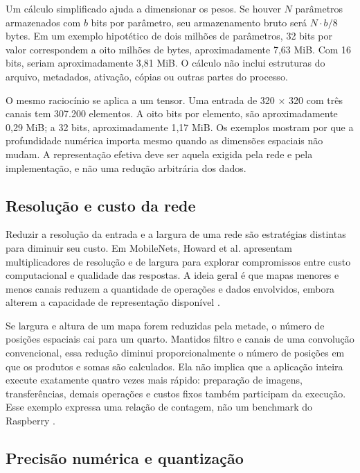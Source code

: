 Um cálculo simplificado ajuda a dimensionar os pesos. Se houver \(N\) parâmetros armazenados com \(b\) bits por parâmetro, seu armazenamento bruto será \(N\cdot b/8\) bytes. Em um exemplo hipotético de dois milhões de parâmetros, 32 bits por valor correspondem a oito milhões de bytes, aproximadamente 7,63 MiB. Com 16 bits, seriam aproximadamente 3,81 MiB. O cálculo não inclui estruturas do arquivo, metadados, ativação, cópias ou outras partes do processo.

O mesmo raciocínio se aplica a um tensor. Uma entrada de 320 \(\times\) 320 com três canais tem 307.200 elementos. A oito bits por elemento, são aproximadamente 0,29 MiB; a 32 bits, aproximadamente 1,17 MiB. Os exemplos mostram por que a profundidade numérica importa mesmo quando as dimensões espaciais não mudam. A representação efetiva deve ser aquela exigida pela rede e pela implementação, e não uma redução arbitrária dos dados.

\subsection{Resolução e custo da rede}
\label{subsec:resolucao-custo}

Reduzir a resolução da entrada e a largura de uma rede são estratégias distintas para diminuir seu custo. Em MobileNets, Howard et al. apresentam multiplicadores de resolução e de largura para explorar compromissos entre custo computacional e qualidade das respostas. A ideia geral é que mapas menores e menos canais reduzem a quantidade de operações e dados envolvidos, embora alterem a capacidade de representação disponível \cite{mobilenets}.

Se largura e altura de um mapa forem reduzidas pela metade, o número de posições espaciais cai para um quarto. Mantidos filtro e canais de uma convolução convencional, essa redução diminui proporcionalmente o número de posições em que os produtos e somas são calculados. Ela não implica que a aplicação inteira execute exatamente quatro vezes mais rápido: preparação de imagens, transferências, demais operações e custos fixos também participam da execução. Esse exemplo expressa uma relação de contagem, não um benchmark do Raspberry \cite{mobilenets}.

\subsection{Precisão numérica e quantização}
\label{subsec:quantizacao}

